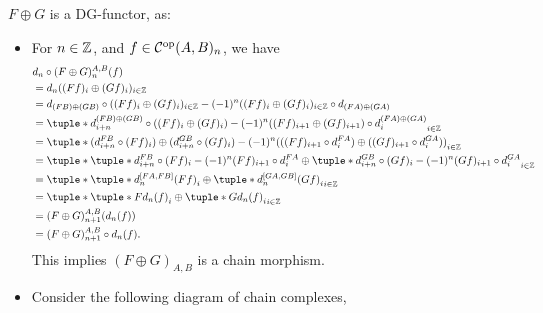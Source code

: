 \begin{remark}
    \( F \oplus G \) is a DG-functor, as:
    \begin{itemize}
        \item {
            For \( n \in {\mathbb{Z}} \), and \( f \in {\mathcal{C}}^{\operatorname{op}}(A, B)_n \), we have
            \begin{align*}
                &d_n \circ (F \oplus G)_n^{A, B} (f) \\
                &= d_n ((F f)_i \oplus (G f)_i)_{i \in \Zb} \\
                &= d_{(F B) \oplus (G B)} \circ ((F f)_i \oplus (G f)_i)_{i \in \Zb} - (-1)^n ((F f)_i \oplus (G f)_i)_{i \in \Zb} \circ d_{(F A) \oplus (G A)} \\
                &= \tuple*{d_{i + n}^{(F B) \oplus (G B)} \circ ((F f)_i \oplus (G f)_i) - (-1)^n ((F f)_{i + 1} \oplus (G f)_{i + 1}) \circ d_i^{(F A) \oplus (G A)}}_{i \in \Zb} \\
                &= \tuple*{ (d_{i + n}^{F B} \circ (F f)_i) \oplus (d_{i + n}^{G B} \circ (G f)_i) - (-1)^n ( ( (F f)_{i + 1} \circ d_i^{F A} ) \oplus ( (G f)_{i + 1} \circ d_i^{G A} ) ) }_{i \in \Zb} \\
                &= \tuple*{ \tuple*{d_{i + n}^{F B} \circ (F f)_i - (-1)^n (F f)_{i + 1} \circ d_i^{F A}} \oplus \tuple*{d_{i + n}^{G B} \circ (G f)_i - (-1)^n (G f)_{i + 1} \circ d_i^{G A}} }_{i \in \Zb} \\
                &= \tuple*{ \tuple*{d_n^{[F A, F B]} (F f)}_i \oplus \tuple*{ d_n^{[G A, G B]} (G f)}_i }_{i \in \Zb} \\
                &= \tuple*{ \tuple*{F d_n (f)}_i \oplus \tuple*{ G d_n (f)}_i }_{i \in \Zb} \\
                &= (F \oplus G)_{n + 1}^{A, B} (d_n (f)) \\
                &= (F \oplus G)_{n + 1}^{A, B} \circ d_n (f).
            \end{align*}
            This implies \( (F \oplus G)_{A, B} \) is a chain morphism.
        }
        \item {
            Consider the following diagram of chain complexes,
            \begin{center}
\end{center}}
\end{itemize}
\end{remark}
